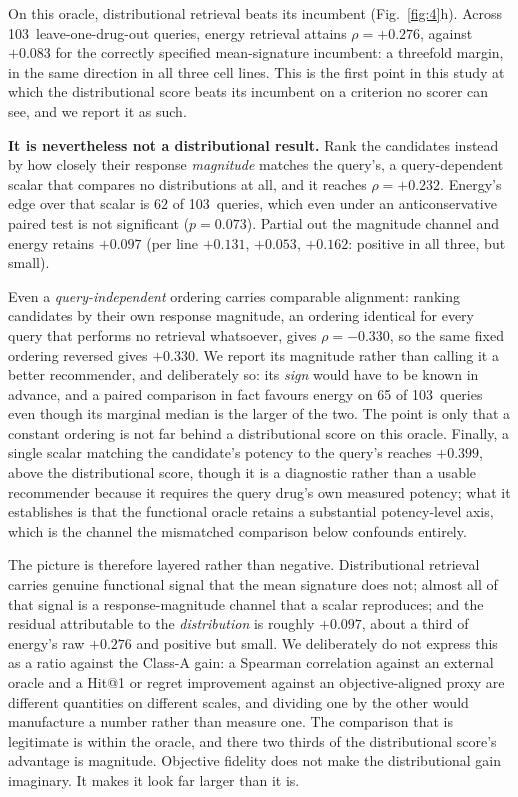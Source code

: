 \documentclass[11pt,letterpaper]{article}
\newcommand{\NCQUERIES}{103}
\newcommand{\ENERGYFUNC}{+0.276}
\newcommand{\MEANCTRLFUNC}{+0.083}
\newcommand{\MAGMATCHFUNC}{+0.232}
\newcommand{\MAGONLYFUNC}{+0.330}
\newcommand{\POTMATCHFUNC}{+0.399}
\newcommand{\ENERGYPARTIAL}{+0.097}
\newcommand{\ENERGYWINS}{62}
\newcommand{\ENERGYWINSP}{0.073}
\begin{document}
On this oracle, distributional retrieval beats its incumbent (Fig.~\ref{fig:4}h). Across
\NCQUERIES\ leave-one-drug-out queries, energy retrieval attains $\rho = \ENERGYFUNC$, against
$\MEANCTRLFUNC$ for the correctly specified mean-signature incumbent: a threefold margin, in the
same direction in all three cell lines. This is the first point in this study at which the
distributional score beats its incumbent on a criterion no scorer can see, and we report it as
such.

\textbf{It is nevertheless not a distributional result.} Rank the candidates instead by how
closely their response \emph{magnitude} matches the query's, a query-dependent scalar that
compares no distributions at all, and it reaches $\rho = \MAGMATCHFUNC$. Energy's edge over that
scalar is $\ENERGYWINS$ of \NCQUERIES\ queries, which even under an anticonservative paired test
is not significant ($p = \ENERGYWINSP$). Partial out the magnitude channel and energy retains
$\ENERGYPARTIAL$ (per line $+0.131$, $+0.053$, $+0.162$: positive in all three, but small).

Even a
\emph{query-independent} ordering carries comparable alignment: ranking candidates by their own
response magnitude, an ordering identical for every query that performs no retrieval whatsoever,
gives $\rho = -0.330$, so the same fixed ordering reversed gives $\MAGONLYFUNC$. We report its
magnitude rather than calling it a better recommender, and deliberately so: its \emph{sign} would
have to be known in advance, and a paired comparison in fact favours energy on 65 of \NCQUERIES\
queries even though its marginal median is the larger of the two. The point is only that a
constant ordering is not far behind a distributional score on this oracle. Finally, a single
scalar matching the candidate's potency to the query's reaches $\POTMATCHFUNC$, above the
distributional score, though it is a diagnostic rather than a usable recommender because it
requires the query drug's own measured potency; what it establishes is that the functional oracle
retains a substantial potency-level axis, which is the channel the mismatched comparison below
confounds entirely.

The picture is therefore layered rather than negative. Distributional retrieval carries genuine
functional signal that the mean signature does not; almost all of that signal is a
response-magnitude channel that a scalar reproduces; and the residual attributable to the
\emph{distribution} is roughly $\ENERGYPARTIAL$, about a third of energy's raw $\ENERGYFUNC$ and
positive but small. We deliberately do not express this as a ratio against the Class-A gain: a
Spearman correlation against an external oracle and a Hit@1 or regret improvement against an
objective-aligned proxy are different quantities on different scales, and dividing one by the
other would manufacture a number rather than measure one. The comparison that is legitimate is
within the oracle, and there two thirds of the distributional score's advantage is magnitude.
Objective fidelity does not make the distributional gain imaginary. It makes it look far larger
than it is.
\end{document}
